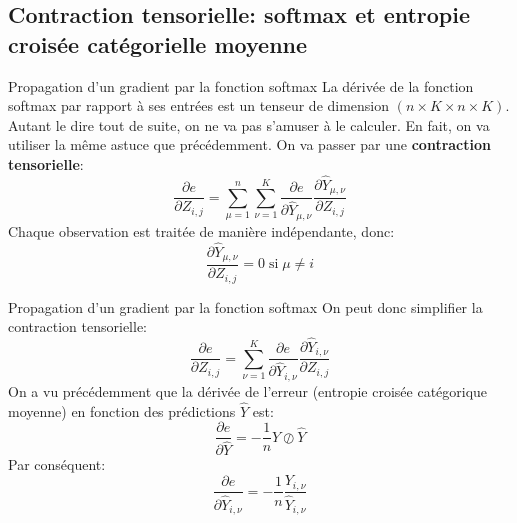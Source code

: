 \subsection{Contraction tensorielle: softmax et entropie croisée catégorielle moyenne}

\begin{frame}{Propagation d'un gradient par la fonction softmax}
	La dérivée de la fonction softmax par rapport à ses entrées est un tenseur de dimension $(n\times K \times n \times K)$. Autant le dire tout de suite, on ne va pas s'amuser à le calculer. En fait, on va utiliser la même astuce que précédemment. On va passer par une \textbf{contraction tensorielle}:
	\begin{equation*}
		\frac{\partial{e}}{\partial{Z_{i,j}}} = \sum_{\mu=1}^n \sum_{\nu=1}^K \frac{\partial{e}}{\partial{\hat{Y}_{\mu,\nu}}} \frac{\partial{\hat{Y}_{\mu,\nu}}}{\partial{Z_{i,j}}}
	\end{equation*}
	\pause
	Chaque observation est traitée de manière indépendante, donc:
	\begin{equation*}
		\frac{\partial{\hat{Y}_{\mu,\nu}}}{\partial{Z_{i,j}}} = 0 \; \text{si} \; \mu \ne i
	\end{equation*}
\end{frame}

\begin{frame}{Propagation d'un gradient par la fonction softmax}
	On peut donc simplifier la contraction tensorielle:
	\begin{equation*}
		\frac{\partial{e}}{\partial{Z_{i,j}}} = \sum_{\nu=1}^K \frac{\partial{e}}{\partial{\hat{Y}_{i,\nu}}} \frac{\partial{\hat{Y}_{i,\nu}}}{\partial{Z_{i,j}}}
	\end{equation*}
	\pause
	On a vu précédemment que la dérivée de l'erreur (entropie croisée catégorique moyenne) en fonction des prédictions $\hat{Y}$ est:
	\begin{equation*}
		\frac{\partial{e}}{\partial{\hat{Y}}} = - \frac{1}{n} Y \oslash \hat{Y}
	\end{equation*}
	Par conséquent:
	\begin{equation*}
		\frac{\partial{e}}{\partial{\hat{Y}_{i,\nu}}} = - \frac{1}{n} \frac{Y_{i,\nu}}{\hat{Y}_{i,\nu}}
	\end{equation*}
\end{frame}

